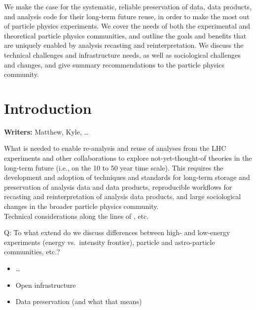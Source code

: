 \documentclass[11pt]{article}
\begin{document}
\begin{Abstract}
\noindent We make the case for the systematic, reliable preservation of data, data products, and analysis code for their long-term future reuse, in order to make the most out of particle physics experiments.
We cover the needs of both the experimental and theoretical particle physics communities, and outline the goals and benefits that are uniquely enabled by analysis recasting and reinterpretation. 
We discuss the technical challenges and infrastructure needs, as well as sociological challenges and changes, and give summary recommendations to the particle physics community.
\end{Abstract}

\clearpage

\tableofcontents

\section{Introduction}

\noindent\textbf{Writers:} Matthew, Kyle, \ldots

What is needed to enable re-analysis and reuse of analyses from the LHC experiments and other collaborations to explore not-yet-thought-of theories in the long-term future (i.e., on the 10 to 50 year time scale).
This requires the development and adoption of techniques and standards for long-term storage and preservation of analysis data and data products, reproducible workflows for recasting and reinterpretation of analysis data products, and large sociological changes in the broader particle physics community.\\
Technical considerations along the lines of \cite{LHCReinterpretationForum:2020xtr,Cranmer:2021urp}, etc. \\


Q: To what extend do we discuss differences between high- and low-energy experiments (energy vs.~intensity frontier), particle and astro-particle communities, etc.?


\begin{itemize}
    \item \ldots
    \item Open infrastructure
    \item Data preservation (and what that means)
\end{itemize}
\end{document}
